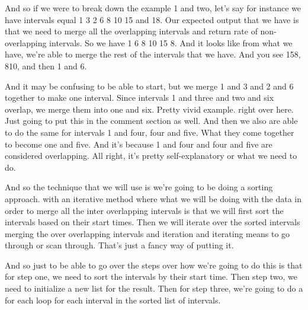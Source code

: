 \expandafter\def\csname sourceexcerpt@39\endcsname{%
And so if we were to break down the example 1 and two, let's say for instance we have
intervals equal 1 3 2 6 8 10 15 and 18. Our expected output that we have is that we
need to merge all the overlapping intervals and return rate of non-overlapping
intervals. So we have 1 6 8 10 15 8. And it looks like from what we have, we're able
to merge the rest of the intervals that we have. And you see 158, 810, and then 1 and
6.

And it may be confusing to be able to start, but we merge 1 and 3 and 2 and 6 together
to make one interval. Since intervals 1 and three and two and six overlap, we merge
them into one and six. Pretty vivid example. right over here. Just going to put this
in the comment section as well. And then we also are able to do the same for intervals
1 and four, four and five. What they come together to become one and five. And it's
because 1 and four and four and five are considered overlapping. All right, it's
pretty self-explanatory or what we need to do.

And so the technique that we will use is we're going to be
doing a sorting approach. with an iterative method where what we will be doing with
the data in order to merge all the inter overlapping intervals is that we will first
sort the intervals based on their start times. Then we will iterate over the sorted
intervals merging the over overlapping intervals and iteration and iterating means to
go through or scan through. That's just a fancy way of putting it.

And so just to be able to go over the steps over how we're going to do this is that
for step one, we need to sort the intervals by their start time. Then step two, we
need to initialize a new list for the result. Then for step three, we're going to do a
for each loop for each interval in the sorted list of intervals.
}

